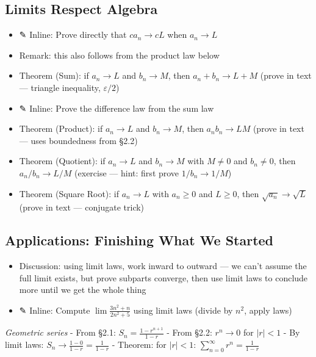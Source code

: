 \documentclass[
  10pt,
  letterpaper,
]{scrbook}
\providecommand{\tightlist}{%
  \setlength{\itemsep}{0pt}\setlength{\parskip}{0pt}}
\begin{document}
\subsection{Limits Respect Algebra}\label{limits-respect-algebra}

\begin{itemize}
\tightlist
\item
  ✎ Inline: Prove directly that \(ca_n \to cL\) when \(a_n \to L\)
\item
  Remark: this also follows from the product law below
\item
  Theorem (Sum): if \(a_n \to L\) and \(b_n \to M\), then
  \(a_n + b_n \to L + M\) (prove in text --- triangle inequality,
  \(\varepsilon/2\))
\item
  ✎ Inline: Prove the difference law from the sum law
\item
  Theorem (Product): if \(a_n \to L\) and \(b_n \to M\), then
  \(a_n b_n \to LM\) (prove in text --- uses boundedness from §2.2)
\item
  Theorem (Quotient): if \(a_n \to L\) and \(b_n \to M\) with
  \(M \neq 0\) and \(b_n \neq 0\), then \(a_n/b_n \to L/M\) (exercise
  --- hint: first prove \(1/b_n \to 1/M\))
\item
  Theorem (Square Root): if \(a_n \to L\) with \(a_n \geq 0\) and
  \(L \geq 0\), then \(\sqrt{a_n} \to \sqrt{L}\) (prove in text ---
  conjugate trick)
\end{itemize}

\subsection{Applications: Finishing What We
Started}\label{applications-finishing-what-we-started}

\begin{itemize}
\tightlist
\item
  Discussion: using limit laws, work inward to outward --- we can't
  assume the full limit exists, but prove subparts converge, then use
  limit laws to conclude more until we get the whole thing
\item
  ✎ Inline: Compute \(\lim \frac{3n^2 + n}{2n^2 + 5}\) using limit laws
  (divide by \(n^2\), apply laws)
\end{itemize}

\emph{Geometric series} - From §2.1: \(S_n = \frac{1 - r^{n+1}}{1-r}\) -
From §2.2: \(r^n \to 0\) for \(|r| < 1\) - By limit laws:
\(S_n \to \frac{1-0}{1-r} = \frac{1}{1-r}\) - Theorem: for \(|r| < 1\):
\(\sum_{n=0}^{\infty} r^n = \frac{1}{1-r}\)
\end{document}
